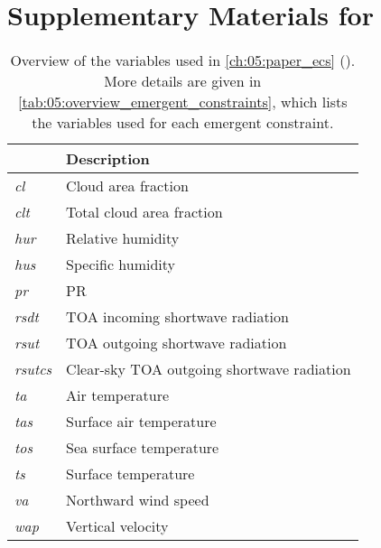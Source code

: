 



\begingroup


\renewcommand{\thesection}{\Alph{section}}


\section{Supplementary Materials for
  \texorpdfstring{}{Chapter \ref{ch:05:paper_ecs}}}
\label{sec:app:si_for_paper_ecs}

\vspace{\fill}

\begin{table}[!h]
  \centering
  \begin{tabulary}{\columnwidth}{>{\em}L L}
    \toprule
     & Description \\
    \midrule
    cl & Cloud area fraction \\
    clt & Total cloud area fraction \\
    hur & Relative humidity \\
    hus & Specific humidity \\
    pr & \Acl{PR} \\
    rsdt & \Acf{TOA} incoming shortwave radiation \\
    rsut & \acs{TOA} outgoing shortwave radiation \\
    rsutcs & Clear-sky \acs{TOA} outgoing shortwave radiation \\
    ta & Air temperature \\
    tas & Surface air temperature \\
    tos & Sea surface temperature \\
    ts & Surface temperature \\
    va & Northward wind speed \\
    wap & Vertical velocity \\
    \bottomrule
  \end{tabulary}
  \caption{Overview of the variables used in \cref{ch:05:paper_ecs}
    (). More details are given in
    \cref{tab:05:overview_emergent_constraints}, which lists the variables
    used for each emergent constraint.}
  \label{tab:app:a:overview_variables}
\end{table}

